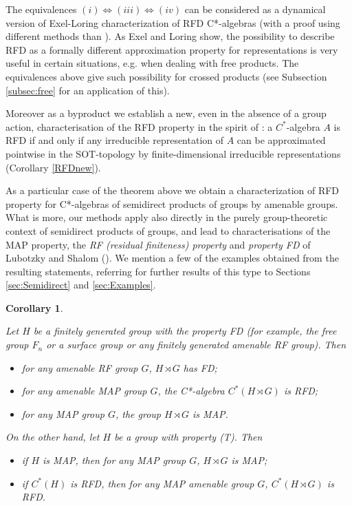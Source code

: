 \documentclass[11 pt, leqno, hidelinks]{amsart}%
\theoremstyle{plain}
\newtheorem{corx}[thmx]{Corollary}
\numberwithin{equation}{section}
\begin{document}
The equivalences $(i)\Leftrightarrow (iii) \Leftrightarrow (iv)$ can be considered as a dynamical version of Exel-Loring characterization of RFD C*-algebras \cite{ExelLoring} (with a proof using different methods than \cite{ExelLoring}).  As Exel and Loring show, the possibility to describe RFD as a formally different approximation property for representations is very useful in certain situations, e.g. when dealing with free products. The equivalences above give such possibility for crossed products (see Subsection \ref{subsec:free} for an application of this).


Moreover as a byproduct we establish a new, even in the absence of a group action,  characterisation of the RFD property in the spirit of \cite{ExelLoring}: a $C^*$-algebra $A$ is RFD if and only if any irreducible representation of $A$ can be approximated pointwise in the SOT-topology by finite-dimensional irreducible  representations (Corollary \ref{RFDnew}).

As a particular case of the theorem above we obtain a characterization of RFD property for C*-algebras of semidirect products of groups by amenable groups. What is more, our methods apply also directly in the purely group-theoretic context of semidirect products of groups, and lead to characterisations of the MAP property,  the \emph{RF (residual finiteness) property} and  \emph{property FD} of Lubotzky and Shalom (\cite{LubotzkyShalom}). We mention a few of the examples  obtained from  the resulting statements, referring for further  results of this type to Sections \ref{sec:Semidirect} and \ref{sec:Examples}.




\begin{corx} \label{corB}
	
	Let $H$ be a finitely generated group with the property FD (for example, the free group $F_n$ or a surface group or any finitely generated amenable RF group). Then
 \begin{itemize}
\item [(i)] for any amenable RF group $G$, $H\rtimes G$ has FD;

\item [(ii)] for any  amenable MAP group $G$, the C*-algebra
$C^*(H\rtimes G)$ is RFD;

\item [(iii)] for any MAP group $G$, the group $H\rtimes G$ is MAP.
\end{itemize}

\medskip

On the other hand, let $H$ be a group with  property (T). Then
\begin{itemize}
	\item [(iv)]  if $H$ is MAP, then for any MAP group $G$,  $H\rtimes G$ is MAP;
	
	\item [(v)] if $C^*(H)$  is RFD, then for any MAP amenable group $G$,  $C^*(H\rtimes G)$ is RFD.
\end{itemize}
\end{corx}
\end{document}
